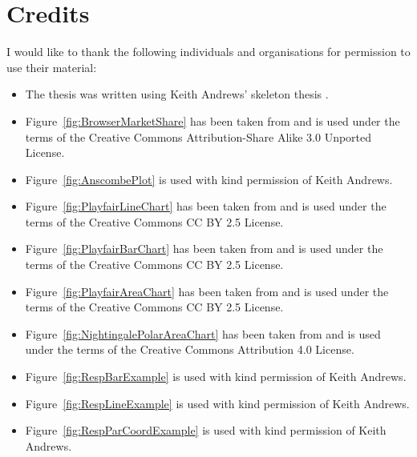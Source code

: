 \chapter*{Credits}

I would like to thank the following individuals and organisations for
permission to use their material:
\begin{itemize}
\item The thesis was written using Keith Andrews' skeleton thesis
  \parencite{KeithThesis}.

  \item Figure~\ref{fig:BrowserMarketShare} has been taken from
  \textcite{BrowserMarketShare} and is used under the terms of the
  Creative Commons Attribution-Share Alike 3.0 Unported License.

  \item Figure~\ref{fig:AnscombePlot} is used with kind permission of
    Keith Andrews.

  \item Figure~\ref{fig:PlayfairLineChart} has been taken from
  \textcite{SCETI} and is used under the terms of the
  Creative Commons CC BY 2.5 License.

  \item Figure~\ref{fig:PlayfairBarChart} has been taken from
  \textcite{SCETI} and is used under the terms of the
  Creative Commons CC BY 2.5 License.

  \item Figure~\ref{fig:PlayfairAreaChart} has been taken from
  \textcite{SCETI} and is used under the terms of the
  Creative Commons CC BY 2.5 License.

  \item Figure~\ref{fig:NightingalePolarAreaChart} has been taken from
  \textcite{HarvardLibrary} and is used under the terms of the
  Creative Commons Attribution 4.0 License.

  \item Figure~\ref{fig:RespBarExample} is used with kind permission of
  Keith Andrews.

  \item Figure~\ref{fig:RespLineExample} is used with kind permission
  of Keith Andrews.

  \item Figure~\ref{fig:RespParCoordExample} is used with kind permission
  of Keith Andrews.

\end{itemize}



